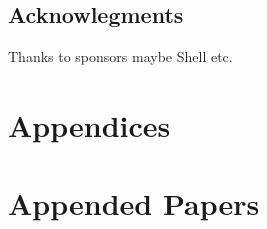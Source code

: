 \documentclass[a4paper, 12pt]{report}
\begin{document}
\clearpage
{}













\chapter*{Acknowlegments}
Thanks to sponsors maybe Shell etc.


\appendix
\part{Appendices}



\part{Appended Papers}
\end{document}
